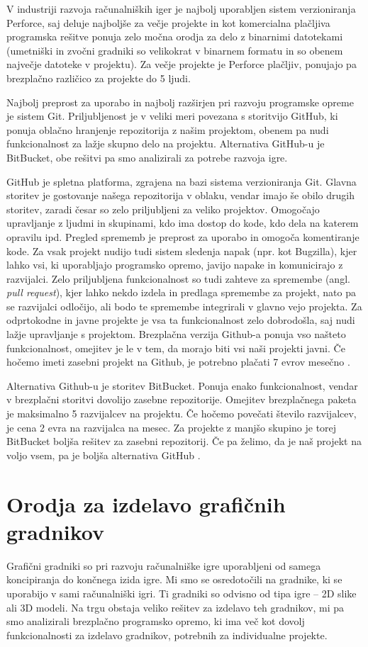 \documentclass[12pt,a4paper,twoside]{book}
\begin{document}
V industriji razvoja računalniških iger je najbolj uporabljen sistem verzioniranja Perforce, saj deluje najboljše za večje projekte in kot komercialna plačljiva programska rešitve ponuja zelo močna orodja za delo z binarnimi datotekami (umetniški in zvočni gradniki so velikokrat v binarnem formatu in so obenem največje datoteke v projektu). Za večje projekte je Perforce plačljiv, ponujajo pa brezplačno različico za projekte do 5 ljudi.

Najbolj preprost za uporabo in najbolj razširjen pri razvoju programske opreme je sistem Git. Priljubljenost je v veliki meri povezana s storitvijo GitHub, ki ponuja oblačno hranjenje repozitorija z našim projektom, obenem pa nudi funkcionalnost za lažje skupno delo na projektu. Alternativa GitHub-u je BitBucket, obe rešitvi pa smo analizirali za potrebe razvoja igre.

GitHub je spletna platforma, zgrajena na bazi sistema verzioniranja Git. Glavna storitev je gostovanje našega repozitorija v oblaku, vendar imajo še obilo drugih storitev, zaradi česar so zelo priljubljeni za veliko projektov. Omogočajo upravljanje z ljudmi in skupinami, kdo ima dostop do kode, kdo dela na katerem opravilu ipd. Pregled sprememb je preprost za uporabo in omogoča komentiranje kode. Za vsak projekt nudijo tudi sistem sledenja napak (npr. kot Bugzilla), kjer lahko vsi, ki uporabljajo programsko opremo, javijo napake in komunicirajo z razvijalci. Zelo priljubljena funkcionalnost so tudi zahteve za spremembe (angl. \textit{pull request}), kjer lahko nekdo izdela in predlaga spremembe za projekt, nato pa se razvijalci odločijo, ali bodo te spremembe integrirali v glavno vejo projekta. Za odprtokodne in javne projekte je vsa ta funkcionalnost zelo dobrodošla, saj nudi lažje upravljanje s projektom. Brezplačna verzija Github-a ponuja vso našteto funkcionalnost, omejitev je le v tem, da morajo biti vsi naši projekti javni. Če hočemo imeti zasebni projekt na Github, je potrebno plačati 7 evrov mesečno \cite{github}.

Alternativa Github-u je storitev BitBucket. Ponuja enako funkcionalnost, vendar v brezplačni storitvi dovolijo zasebne repozitorije. Omejitev brezplačnega paketa je maksimalno 5 razvijalcev na projektu. Če hočemo povečati število razvijalcev, je cena 2 evra na razvijalca na mesec. Za projekte z manjšo skupino je torej BitBucket boljša rešitev za zasebni repozitorij. Če pa želimo, da je naš projekt na voljo vsem, pa je boljša alternativa GitHub \cite{bitBucket}.

\section{Orodja za izdelavo grafičnih gradnikov}
Grafični gradniki so pri razvoju računalniške igre uporabljeni od samega koncipiranja do končnega izida igre. Mi smo se osredotočili na gradnike, ki se uporabijo v sami računalniški igri. Ti gradniki so odvisno od tipa igre -- 2D slike ali 3D modeli. Na trgu obstaja veliko rešitev za izdelavo teh gradnikov, mi pa smo analizirali brezplačno programsko opremo, ki ima več kot dovolj funkcionalnosti za izdelavo gradnikov, potrebnih za individualne projekte.
\end{document}
